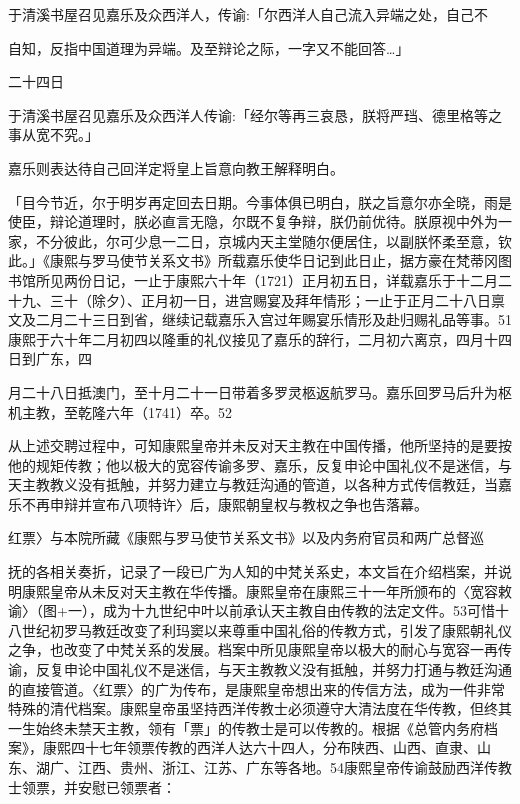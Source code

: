 于清溪书屋召见嘉乐及众西洋人，传谕:「尔西洋人自己流入异端之处，自己不

自知，反指中国道理为异端。及至辩论之际，一字又不能回答…」

二十四日

于清溪书屋召见嘉乐及众西洋人传谕:「经尔等再三哀恳，朕将严珰、德里格等之事从宽不究。」

嘉乐则表达待自己回洋定将皇上旨意向教王解释明白。

「目今节近，尔于明岁再定回去日期。今事体俱已明白，朕之旨意尔亦全晓，雨是使臣，辩论道理时，朕必直言无隐，尔既不复争辩，朕仍前优待。朕原视中外为一家，不分彼此，尔可少息一二日，京城内天主堂随尔便居住，以副朕怀柔至意，钦此。」《康熙与罗马使节关系文书》所载嘉乐使华日记到此日止，据方豪在梵蒂冈图书馆所见两份日记，一止于康熙六十年（1721）正月初五日，详载嘉乐于十二月二十九、三十（除夕）、正月初一日，进宫赐宴及拜年情形；一止于正月二十八日禀文及二月二十三日到省，继续记载嘉乐入宫过年赐宴乐情形及赴归赐礼品等事。51康熙于六十年二月初四以隆重的礼仪接见了嘉乐的辞行，二月初六离京，四月十四日到广东，四

\vfill
\begin{BookNotes}
\end{BookNotes}

\noindent 月二十八日抵澳门，至十月二十一日带着多罗灵柩返航罗马。嘉乐回罗马后升为枢机主教，至乾隆六年（1741）卒。52

从上述交聘过程中，可知康熙皇帝并未反对天主教在中国传播，他所坚持的是要按他的规矩传教；他以极大的宽容传谕多罗、嘉乐，反复申论中国礼仪不是迷信，与天主教教义没有抵触，并努力建立与教廷沟通的管道，以各种方式传信教廷，当嘉乐不再申辩并宣布八项特许〉后，康熙朝皇权与教权之争也告落幕。


\begin{BookQuote}
红票〉与本院所藏《康熙与罗马使节关系文书》以及内务府官员和两广总督巡
\end{BookQuote}

抚的各相关奏折，记录了一段已广为人知的中梵关系史，本文旨在介绍档案，并说明康熙皇帝从未反对天主教在华传播。康熙皇帝在康熙三十一年所颁布的〈宽容敕谕〉（图+一），成为十九世纪中叶以前承认天主教自由传教的法定文件。53可惜十八世纪初罗马教廷改变了利玛窦以来尊重中国礼俗的传教方式，引发了康熙朝礼仪之争，也改变了中梵关系的发展。档案中所见康熙皇帝以极大的耐心与宽容一再传谕，反复申论中国礼仪不是迷信，与天主教教义没有抵触，并努力打通与教廷沟通的直接管道。〈红票〉的广为传布，是康熙皇帝想出来的传信方法，成为一件非常特殊的清代档案。康熙皇帝虽坚持西洋传教士必须遵守大清法度在华传教，但终其一生始终未禁天主教，领有「票」的传教士是可以传教的。根据《总管内务府档案》，康熙四十七年领票传教的西洋人达六十四人，分布陕西、山西、直隶、山东、湖广、江西、贵州、浙江、江苏、广东等各地。54康熙皇帝传谕鼓励西洋传教士领票，并安慰已领票者：

